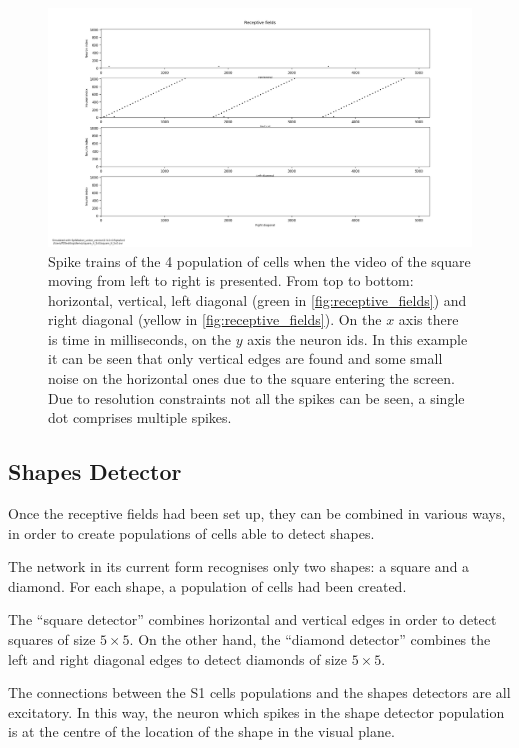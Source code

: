\begin{figure}[ht]
\centering
\includegraphics[width=\textwidth]{images/development/receptive_fields_square_lr.png}
\caption[Receptive Fields Spike Trains of Square]{Spike trains of the 4 population of cells when the video of the square moving from left to right is presented. From top to bottom: horizontal, vertical, left diagonal (green in \cref{fig:receptive_fields}) and right diagonal (yellow in \cref{fig:receptive_fields}). On the $x$ axis there is time in milliseconds, on the $y$ axis the neuron ids. In this example it can be seen that only vertical edges are found and some small noise on the horizontal ones due to the square entering the screen. Due to resolution constraints not all the spikes can be seen, a single dot comprises multiple spikes.}
\label{fig:receptive_fields_square_lr}
\end{figure}

\subsection{Shapes Detector}
Once the receptive fields had been set up, they can be combined in various ways, in order to create populations of cells able to detect shapes.

The network in its current form recognises only two shapes: a square and a diamond. For each shape, a population of cells had been created.

The ``square detector'' combines horizontal and vertical edges in order to detect squares of size $5 \times 5$. On the other hand, the ``diamond detector'' combines the left and right diagonal edges to detect diamonds of size $5 \times 5$. 

The connections between the \textsc{S1} cells populations and the shapes detectors are all excitatory. In this way, the neuron which spikes in the shape detector population is at the centre of the location of the shape in the visual plane. 

